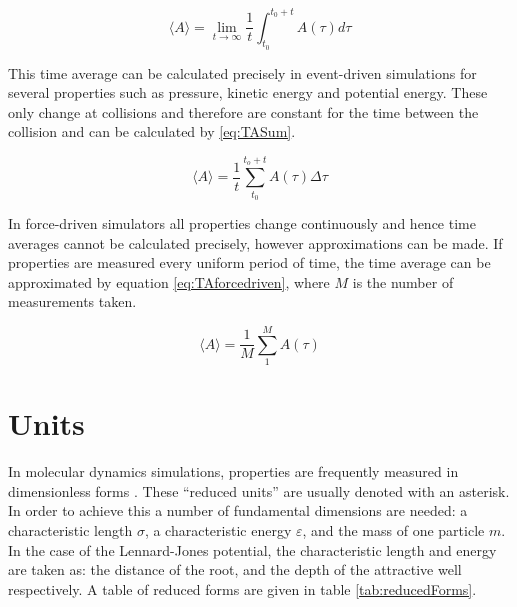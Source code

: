 \documentclass[12pt]{UoAthesis}
\begin{document}
\begin{equation}
  \label{eq:TAdef}
  \langle A \rangle = \lim_{t \to \infty} \frac{1}{t}  \int^{t_0+t}_{t_0}A(\tau) d\tau
\end{equation}

This time average can be calculated precisely in event-driven
simulations for several properties such as pressure, kinetic energy
and potential energy.  These only change at collisions and therefore
are constant for the time between the collision and can be calculated
by \eqref{eq:TASum}.

\begin{equation}
  \label{eq:TASum}
  \langle A \rangle = \frac{1}{t}\sum^{t_o+t}_{t_0}A(\tau)\Delta \tau
\end{equation}

In force-driven simulators all properties change continuously and
hence time averages cannot be calculated precisely, however
approximations can be made. If properties are measured every uniform
period of time, the time average can be approximated by equation
\eqref{eq:TAforcedriven}, where $M$ is the number of measurements
taken.

\begin{equation}
  \label{eq:TAforcedriven}
  \langle A \rangle = \frac{1}{M} \sum^{M}_{1}A(\tau)
\end{equation}
\section{Units}

In molecular dynamics simulations, properties are frequently measured
in dimensionless forms \cite{Haile1997}. These ``reduced units'' are
usually denoted with an asterisk.  In order to achieve this a number
of fundamental dimensions are needed: a characteristic length $\sigma$, a
characteristic energy $\varepsilon$, and the mass of one particle $m$.  In the case of
the Lennard-Jones potential, the characteristic length and energy are
taken as: the distance of the root, and the depth of the attractive
well respectively. A table of reduced forms are given in table
\ref{tab:reducedForms}.
\end{document}
